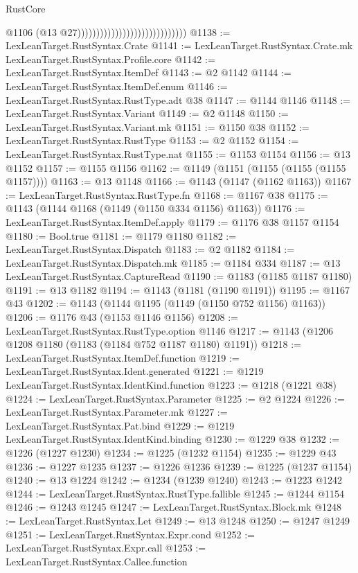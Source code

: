 \begin{lexlean}{RustCore}
\begin{coremodule}
                                                            @1106
                                                            (@13 @27)))))))))))))))))))))))))))))
@1138 := LexLeanTarget.RustSyntax.Crate
@1141 := LexLeanTarget.RustSyntax.Crate.mk LexLeanTarget.RustSyntax.Profile.core
@1142 := LexLeanTarget.RustSyntax.ItemDef
@1143 := @2 @1142
@1144 := LexLeanTarget.RustSyntax.ItemDef.enum
@1146 := LexLeanTarget.RustSyntax.RustType.adt @38
@1147 := @1144 @1146
@1148 := LexLeanTarget.RustSyntax.Variant
@1149 := @2 @1148
@1150 := LexLeanTarget.RustSyntax.Variant.mk
@1151 := @1150 @38
@1152 := LexLeanTarget.RustSyntax.RustType
@1153 := @2 @1152
@1154 := LexLeanTarget.RustSyntax.RustType.nat
@1155 := @1153 @1154
@1156 := @13 @1152
@1157 := @1155 @1156
@1162 := @1149 (@1151 (@1155 (@1155 (@1155 @1157))))
@1163 := @13 @1148
@1166 := @1143 (@1147 (@1162 @1163))
@1167 := LexLeanTarget.RustSyntax.RustType.fn
@1168 := @1167 @38
@1175 := @1143 (@1144 @1168 (@1149 (@1150 @334 @1156) @1163))
@1176 := LexLeanTarget.RustSyntax.ItemDef.apply
@1179 := @1176 @38 @1157 @1154
@1180 := Bool.true
@1181 := @1179 @1180
@1182 := LexLeanTarget.RustSyntax.Dispatch
@1183 := @2 @1182
@1184 := LexLeanTarget.RustSyntax.Dispatch.mk
@1185 := @1184 @334
@1187 := @13 LexLeanTarget.RustSyntax.CaptureRead
@1190 := @1183 (@1185 @1187 @1180)
@1191 := @13 @1182
@1194 := @1143 (@1181 (@1190 @1191))
@1195 := @1167 @43
@1202 := @1143 (@1144 @1195 (@1149 (@1150 @752 @1156) @1163))
@1206 := @1176 @43 (@1153 @1146 @1156)
@1208 := LexLeanTarget.RustSyntax.RustType.option @1146
@1217 := @1143 (@1206 @1208 @1180 (@1183 (@1184 @752 @1187 @1180) @1191))
@1218 := LexLeanTarget.RustSyntax.ItemDef.function
@1219 := LexLeanTarget.RustSyntax.Ident.generated
@1221 := @1219 LexLeanTarget.RustSyntax.IdentKind.function
@1223 := @1218 (@1221 @38)
@1224 := LexLeanTarget.RustSyntax.Parameter
@1225 := @2 @1224
@1226 := LexLeanTarget.RustSyntax.Parameter.mk
@1227 := LexLeanTarget.RustSyntax.Pat.bind
@1229 := @1219 LexLeanTarget.RustSyntax.IdentKind.binding
@1230 := @1229 @38
@1232 := @1226 (@1227 @1230)
@1234 := @1225 (@1232 @1154)
@1235 := @1229 @43
@1236 := @1227 @1235
@1237 := @1226 @1236
@1239 := @1225 (@1237 @1154)
@1240 := @13 @1224
@1242 := @1234 (@1239 @1240)
@1243 := @1223 @1242
@1244 := LexLeanTarget.RustSyntax.RustType.fallible
@1245 := @1244 @1154
@1246 := @1243 @1245
@1247 := LexLeanTarget.RustSyntax.Block.mk
@1248 := LexLeanTarget.RustSyntax.Let
@1249 := @13 @1248
@1250 := @1247 @1249
@1251 := LexLeanTarget.RustSyntax.Expr.cond
@1252 := LexLeanTarget.RustSyntax.Expr.call
@1253 := LexLeanTarget.RustSyntax.Callee.function

\end{coremodule}
\end{lexlean}
